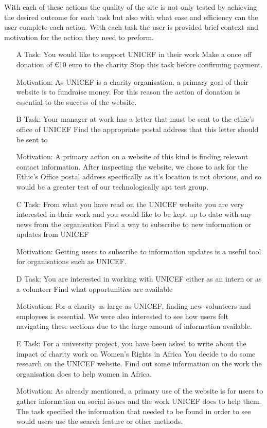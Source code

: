   With each of these actions the quality of the site is not only tested by achieving the desired outcome for each task but also with what ease and efficiency can the user complete each action. 
  With each task the user is provided brief context and motivation for the action they need to preform. 

\begin{itemize}
    \item [A] Task: You would like to support UNICEF in their work 
    Make a once off donation of €10 euro to the charity 
    Stop this task before confirming payment.
    \item [] Motivation: As UNICEF is a charity organisation, a primary goal of their website is to fundraise money. For this reason the action of donation is essential to the success of the website. 

    \item[B] Task: Your manager at work has a letter that must be sent to the ethic’s office of UNICEF 
    Find the appropriate postal address that this letter should be sent to
    
    \item[] Motivation: A primary action on a website of this kind is finding relevant contact information. After inspecting the website, we chose to ask for the Ethic’s Office postal address specifically as it’s location is not obvious, and so would be a greater test of our technologically apt test group. 

    \item[C] Task: From what you have read on the UNICEF website you are very interested in their work and you would like to be kept up to date with any news from the organisation
    Find a way to subscribe to new information or updates from UNICEF

    \item[] Motivation: Getting users to subscribe to information updates is a useful tool for organisations such as UNICEF.
    
    \item[D] Task: You are interested in working with UNICEF either as an intern or as a volunteer
    Find what opportunities are available
    \item[] Motivation: For a charity as large as UNICEF, finding new volunteers and employees is essential. We were also interested to see how users felt navigating these sections due to the large amount of information available. 
    
    \item[E] Task: For a university project, you have been asked to write about the impact of charity work on Women’s Rights in Africa
    You decide to do some research on the UNICEF website.
    Find out some information on the work the organisation does to help women in Africa. 
    \item[] Motivation: As already mentioned, a primary use of the website is for users to gather information on social issues and the work UNICEF does to help them. The task specified the information that needed to be found in order to see would users use the search feature or other methods. 


\end{itemize}
